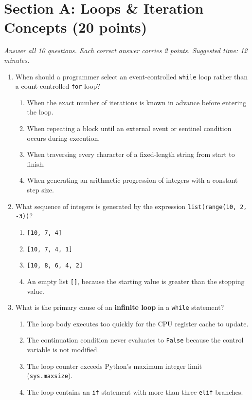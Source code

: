 \documentclass[11pt,a4paper]{article}
\begin{document}
\section*{Section A: Loops \& Iteration Concepts \hfill \normalsize\normalfont(20 points)}
\textit{Answer all 10 questions. Each correct answer carries 2 points. Suggested time: 12 minutes.}

\begin{enumerate}[label=\textbf{Q\arabic*.},leftmargin=2em,itemsep=1.5pt,topsep=1pt]

\item When should a programmer select an event-controlled \texttt{while} loop rather than a count-controlled \texttt{for} loop?
\begin{enumerate}[label=\Alph*.,leftmargin=2em]
  \item When the exact number of iterations is known in advance before entering the loop.
  \item When repeating a block until an external event or sentinel condition occurs during execution.
  \item When traversing every character of a fixed-length string from start to finish.
  \item When generating an arithmetic progression of integers with a constant step size.
\end{enumerate}

\item What sequence of integers is generated by the expression \texttt{list(range(10, 2, -3))}?
\begin{enumerate}[label=\Alph*.,leftmargin=2em]
  \item \texttt{[10, 7, 4]}
  \item \texttt{[10, 7, 4, 1]}
  \item \texttt{[10, 8, 6, 4, 2]}
  \item An empty list \texttt{[]}, because the starting value is greater than the stopping value.
\end{enumerate}

\item What is the primary cause of an \textbf{infinite loop} in a \texttt{while} statement?
\begin{enumerate}[label=\Alph*.,leftmargin=2em]
  \item The loop body executes too quickly for the CPU register cache to update.
  \item The continuation condition never evaluates to \texttt{False} because the control variable is not modified.
  \item The loop counter exceeds Python's maximum integer limit (\texttt{sys.maxsize}).
  \item The loop contains an \texttt{if} statement with more than three \texttt{elif} branches.
\end{enumerate}


\end{enumerate}
\end{document}
